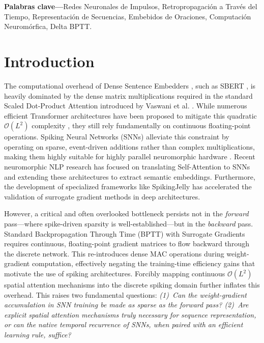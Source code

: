 \documentclass[10pt,journal,compsoc]{IEEEtran}
\begin{document}
\begin{IEEEkeywords}
\textbf{Palabras clave---}Redes Neuronales de Impulsos, Retropropagación a Través del Tiempo, Representación de Secuencias, Embebidos de Oraciones, Computación Neuromórfica, Delta BPTT.
\end{IEEEkeywords}

\section{Introduction}

The computational overhead of Dense Sentence Embedders \cite{devlin2018bert}, such as SBERT \cite{reimers2019sentence}, is heavily dominated by the dense matrix multiplications required in the standard Scaled Dot-Product Attention introduced by Vaswani et al. \cite{vaswani2017attention}. While numerous efficient Transformer architectures have been proposed to mitigate this quadratic $\mathcal{O}(L^2)$ complexity \cite{tay2022efficient}, they still rely fundamentally on continuous floating-point operations. Spiking Neural Networks (SNNs) alleviate this constraint by operating on sparse, event-driven additions rather than complex multiplications, making them highly suitable for highly parallel neuromorphic hardware \cite{roy2019towards}. Recent neuromorphic NLP research has focused on translating Self-Attention to SNNs \cite{li2022spikeformer, zhu2023spikegpt} and extending these architectures to extract semantic embeddings. Furthermore, the development of specialized frameworks like SpikingJelly \cite{fang2023spikingjelly} has accelerated the validation of surrogate gradient methods in deep architectures.

However, a critical and often overlooked bottleneck persists not in the \textit{forward} pass---where spike-driven sparsity is well-established---but in the \textit{backward} pass. Standard Backpropagation Through Time (BPTT) with Surrogate Gradients \cite{neftci2019surrogate} requires continuous, floating-point gradient matrices to flow backward through the discrete network. This re-introduces dense MAC operations during weight-gradient computation, effectively negating the training-time efficiency gains that motivate the use of spiking architectures. Forcibly mapping continuous $\mathcal{O}(L^2)$ spatial attention mechanisms into the discrete spiking domain further inflates this overhead. This raises two fundamental questions: \textit{(1)~Can the weight-gradient accumulation in SNN training be made as sparse as the forward pass? (2)~Are explicit spatial attention mechanisms truly necessary for sequence representation, or can the native temporal recurrence of SNNs, when paired with an efficient learning rule, suffice?}
\end{document}
